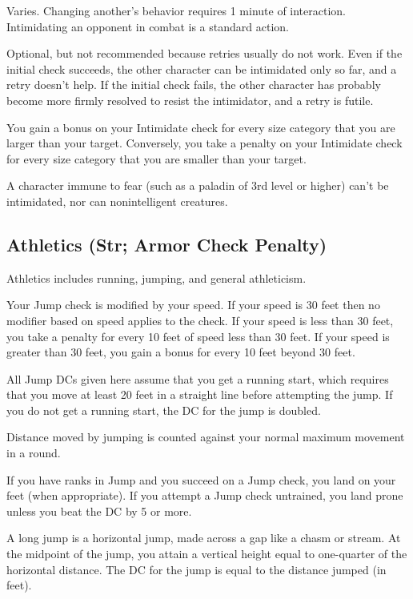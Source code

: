  Varies. Changing another's behavior requires 1 minute of interaction. Intimidating an opponent in combat is a standard action.

 Optional, but not recommended because retries usually do not work. Even if the initial check succeeds, the other character can be intimidated only so far, and a retry doesn't help. If the initial check fails, the other character has probably become more firmly resolved to resist the intimidator, and a retry is futile.

 You gain a  bonus on your Intimidate check for every size category that you are larger than your target. Conversely, you take a  penalty on your Intimidate check for every size category that you are smaller than your target.

\par A character immune to fear (such as a paladin of 3rd level or higher) can't be intimidated, nor can nonintelligent creatures.

\subsection{Athletics (Str; Armor Check Penalty)}
Athletics includes running, jumping, and general athleticism.

Your Jump check is modified by your speed. If your speed is 30 feet then no modifier based on speed applies to the check. If your speed is less than 30 feet, you take a  penalty for every 10 feet of speed less than 30 feet. If your speed is greater than 30 feet, you gain a  bonus for every 10 feet beyond 30 feet.

All Jump DCs given here assume that you get a running start, which requires that you move at least 20 feet in a straight line before attempting the jump. If you do not get a running start, the DC for the jump is doubled.

Distance moved by jumping is counted against your normal maximum movement in a round.

If you have ranks in Jump and you succeed on a Jump check, you land on your feet (when appropriate). If you attempt a Jump check untrained, you land prone unless you beat the DC by 5 or more.

 A long jump is a horizontal jump, made across a gap like a chasm or stream. At the midpoint of the jump, you attain a vertical height equal to one-quarter of the horizontal distance. The DC for the jump is equal to the distance jumped (in feet).

